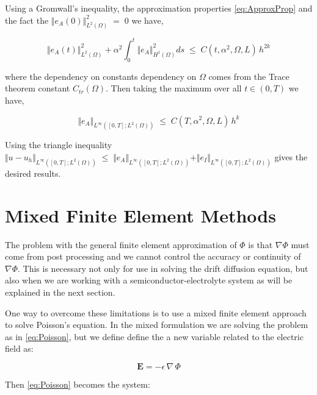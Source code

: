 \documentclass[10pt]{report}
\numberwithin{equation}{section}
\begin{document}
Using a Gromwall's inequality, the approximation properties \eqref{eq:ApproxProp} and the fact the  $\Vert e_{A}(0) \Vert_{L^{2}(\Omega)}^{2} \; = \; 0$ we have,


\begin{equation}
\Vert e_{A}(t) \Vert_{L^{2}(\Omega)}^{2}  + \alpha^{2}\int_{0}^{t} \Vert e_{A} \Vert_{H^{1}(\Omega)}^{2} ds  \; \leq \; C(t,\alpha^{2}, \Omega,L) \, h^{2k}
\end{equation}



where the dependency on constants dependency on $\Omega$ comes from the Trace theorem constant $C_{tr}(\Omega)$.  Then taking the maximum over all $t \in (0,T)$ we have,

\begin{equation}
\Vert e_{A} \Vert_{L^{\infty}([0,T];L^{2}(\Omega))}  \; \leq \; C(T,\alpha^{2}, \Omega,L) \, h^{k}
\end{equation}



Using the triangle inequality $\Vert u - u_{h}  \Vert_{L^{\infty}([0,T];L^{2}(\Omega))}  \; \leq \; \Vert e_{A} \Vert_{L^{\infty}([0,T];L^{2}(\Omega))} + \Vert e_{I} \Vert_{L^{\infty}([0,T];L^{2}(\Omega))}$ gives the desired results.


\newpage

\chapter{Mixed Finite Element Methods}


\noindent
The problem with the general finite element approximation of $\Phi$ is that $\nabla \Phi$ must come from post processing and we cannot control the accuracy or continuity of $\nabla \Phi$.  This is necessary not only for use in solving the drift diffusion equation, but also when we are working with a semiconductor-electrolyte system as will be explained in the next section.


\vspace{3mm}


\noindent
One way to overcome these limitations is to use a mixed finite element approach to solve Poisson's equation.  In the mixed formulation we are solving the problem as in \eqref{eq:Poisson}, but we define define the a new variable related to the electric field as:


$$ \textbf{E}= -\epsilon \, \nabla \, \Phi $$


\noindent
Then \eqref{eq:Poisson} becomes the system:
\end{document}
